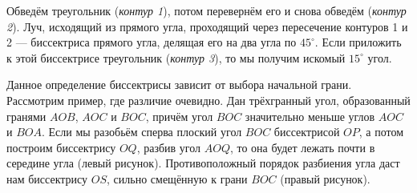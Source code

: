 \begin{itemize}
\itA %
%
Обведём треугольник ({\itshape контур 1}), потом перевернём его и снова обведём ({\itshape контур 2}).
Луч, исходящий из прямого угла, проходящий через пересечение контуров 1 и 2 --- биссектриса прямого угла,
делящая его на два угла по $45^\circ$.
Если приложить к этой биссектрисе треугольник ({\itshape контур 3}), то мы получим искомый $15^\circ$ угол.

\begin{center}\end{center}

\itB %
%
Данное определение биссектрисы зависит от выбора начальной \linebreak грани. Рассмотрим пример,
где различие очевидно. Дан трёхгранный угол, образованный гранями $AOB$, $AOC$ и $BOC$,
причём угол $BOC$ значительно меньше углов $AOC$ и $BOA$.
Если мы разобьём сперва плоский угол $BOC$ биссектрисой $OP$, а потом 
построим биссектрису $OQ$, разбив угол $AOQ$, то она будет лежать почти в середине угла (левый рисунок).
Противоположный порядок разбиения угла даст нам биссектрису $OS$, сильно смещённую к грани $BOC$ (правый рисунок).



\end{itemize}
